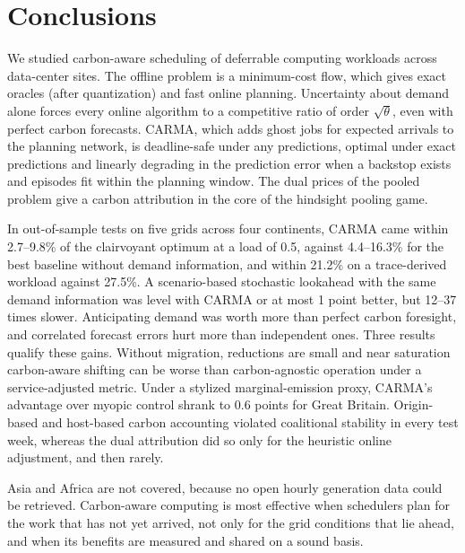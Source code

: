 \section{Conclusions}\label{sec:conclusion}

We studied carbon-aware scheduling of deferrable computing workloads across data-center sites. The offline problem is a minimum-cost flow, which gives exact oracles (after quantization) and fast online planning. Uncertainty about demand alone forces every online algorithm to a competitive ratio of order $\sqrt\theta$, even with perfect carbon forecasts. CARMA, which adds ghost jobs for expected arrivals to the planning network, is deadline-safe under any predictions, optimal under exact predictions and linearly degrading in the prediction error when a backstop exists and episodes fit within the planning window. The dual prices of the pooled problem give a carbon attribution in the core of the hindsight pooling game.

In out-of-sample tests on five grids across four continents, CARMA came within 2.7--9.8\% of the clairvoyant optimum at a load of 0.5, against 4.4--16.3\% for the best baseline without demand information, and within 21.2\% on a trace-derived workload against 27.5\%. A scenario-based stochastic lookahead with the same demand information was level with CARMA or at most 1 point better, but 12--37 times slower. Anticipating demand was worth more than perfect carbon foresight, and correlated forecast errors hurt more than independent ones. Three results qualify these gains. Without migration, reductions are small and near saturation carbon-aware shifting can be worse than carbon-agnostic operation under a service-adjusted metric. Under a stylized marginal-emission proxy, CARMA's advantage over myopic control shrank to 0.6 points for Great Britain. Origin-based and host-based carbon accounting violated coalitional stability in every test week, whereas the dual attribution did so only for the heuristic online adjustment, and then rarely.

Asia and Africa are not covered, because no open hourly generation data could be retrieved. Carbon-aware computing is most effective when schedulers plan for the work that has not yet arrived, not only for the grid conditions that lie ahead, and when its benefits are measured and shared on a sound basis.
